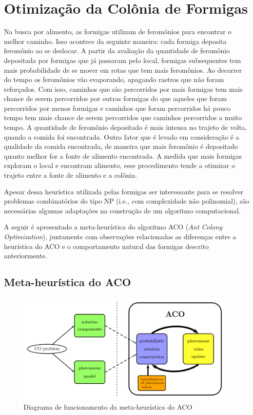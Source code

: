 \section{Otimização da Colônia de Formigas}

Na busca por alimento, as formigas utilizam de feromônios para encontrar o melhor caminho.
Isso acontece da seguinte maneira: cada formiga deposita feromônio ao se deslocar. A partir
da avaliação da quantidade de feromônio depositada por formigas que já passaram pelo local,
formigas subsequentes tem mais probabilidade de se mover em rotas que tem mais feromônios. Ao
decorrer do tempo os feromônios vão evaporando, apagando rastros que não foram reforçados. 
Com isso, caminhos que são percorridos por mais formigas tem mais chance de serem 
percorridos por outras formigas do que aqueles que foram percorridos por menos formigas e 
caminhos que foram percorridos há pouco tempo tem mais chance de serem percorridos que caminhos
percorridos a muito tempo. A quantidade de feromônio depositado é mais intensa no trajeto de volta,
quando a comida foi encontrada. Outro fator que é levado em consideração é a qualidade da comida
encontrada, de maneira que mais feromônio é depositado quanto melhor for a fonte de alimento encontrada.
A medida que mais formigas exploram o local e encontram alimento, esse procedimento tende a otimizar o
trajeto entre a fonte de alimento e a colônia.

Apesar dessa heurística utilizada pelas formigas ser interessante para se resolver problemas combinatórios 
do tipo NP (i.e., com complexidade não polinomial), são necessárias algumas adaptações na construção
de um algoritmo computacional.

A seguir é apresentado a meta-heurística do algoritmo ACO (\textit{Ant Colony Optimization}),
juntamente com observações relacionadas as diferenças entre a heurística do ACO e o
comportamento natural das formigas descrito anteriormente.

\subsection{Meta-heurística do ACO}

\begin{figure}[ht]
  \includegraphics[width = 0.9 \linewidth]{imgs/meta_heuristica_aco}
  \caption{Diagrama de funcionamento da meta-heurística do ACO \cite{blum2005aco}}
  \label{diagrama_metaheuristica_aco}
\end{figure}

